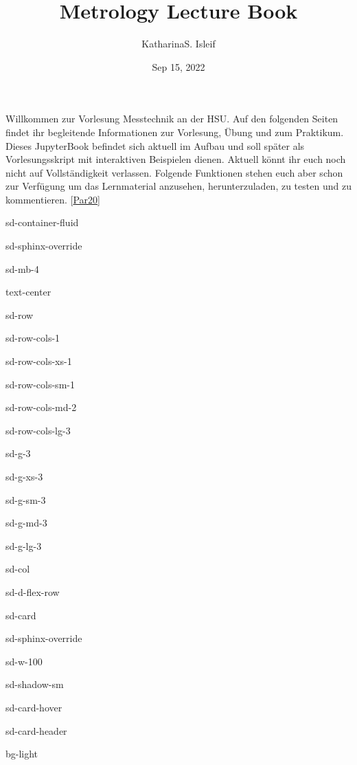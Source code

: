 \documentclass[letterpaper,10pt,english]{jupyterBook}
\title{Metrology Lecture Book}
\date{Sep 15, 2022}
\author{Katharina\sphinxhyphen{}S.\@{} Isleif}
\begin{document}
\pagestyle{empty}
\sphinxmaketitle
\pagestyle{plain}
\sphinxtableofcontents
\pagestyle{normal}
\label{\detokenize{intro::doc}}


\sphinxAtStartPar
Willkommen zur Vorlesung Messtechnik an der HSU. Auf den folgenden Seiten findet ihr begleitende Informationen zur Vorlesung, Übung und zum Praktikum.
Dieses Jupyter\sphinxhyphen{}Book befindet sich aktuell im Aufbau und soll später als Vorlesungsskript mit interaktiven Beispielen dienen.
Aktuell könnt ihr euch noch nicht auf Vollständigkeit verlassen. Folgende Funktionen stehen euch aber schon zur Verfügung um das Lernmaterial anzusehen, herunterzuladen, zu testen und zu kommentieren. {[}\hyperlink{cite.intro:id3}{Par20}{]}

\begin{sphinxuseclass}{sd-container-fluid}
\begin{sphinxuseclass}{sd-sphinx-override}
\begin{sphinxuseclass}{sd-mb-4}
\begin{sphinxuseclass}{text-center}
\begin{sphinxuseclass}{sd-row}
\begin{sphinxuseclass}{sd-row-cols-1}
\begin{sphinxuseclass}{sd-row-cols-xs-1}
\begin{sphinxuseclass}{sd-row-cols-sm-1}
\begin{sphinxuseclass}{sd-row-cols-md-2}
\begin{sphinxuseclass}{sd-row-cols-lg-3}
\begin{sphinxuseclass}{sd-g-3}
\begin{sphinxuseclass}{sd-g-xs-3}
\begin{sphinxuseclass}{sd-g-sm-3}
\begin{sphinxuseclass}{sd-g-md-3}
\begin{sphinxuseclass}{sd-g-lg-3}
\begin{sphinxuseclass}{sd-col}
\begin{sphinxuseclass}{sd-d-flex-row}
\begin{sphinxuseclass}{sd-card}
\begin{sphinxuseclass}{sd-sphinx-override}
\begin{sphinxuseclass}{sd-w-100}
\begin{sphinxuseclass}{sd-shadow-sm}
\begin{sphinxuseclass}{sd-card-hover}
\begin{sphinxuseclass}{sd-card-header}
\begin{sphinxuseclass}{bg-light}
\sphinxAtStartPar
{} 👩‍🔬


\end{sphinxuseclass}
\end{sphinxuseclass}
\end{sphinxuseclass}
\end{sphinxuseclass}
\end{sphinxuseclass}
\end{sphinxuseclass}
\end{sphinxuseclass}
\end{sphinxuseclass}
\end{sphinxuseclass}
\end{sphinxuseclass}
\end{sphinxuseclass}
\end{sphinxuseclass}
\end{sphinxuseclass}
\end{sphinxuseclass}
\end{sphinxuseclass}
\end{sphinxuseclass}
\end{sphinxuseclass}
\end{sphinxuseclass}
\end{sphinxuseclass}
\end{sphinxuseclass}
\end{sphinxuseclass}
\end{sphinxuseclass}
\end{sphinxuseclass}
\end{sphinxuseclass}
\end{document}
